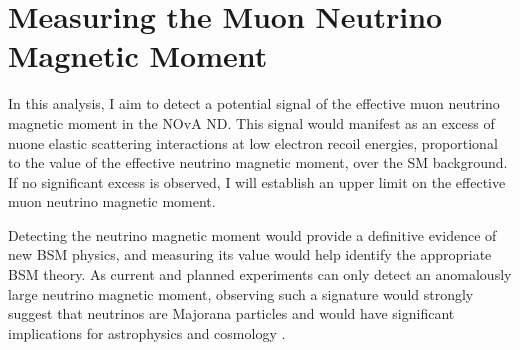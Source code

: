 \chapter{Measuring the Muon Neutrino Magnetic Moment}\label{sec:NeutrinoMagMoment}

In this analysis, I aim to detect a potential signal of the effective muon neutrino magnetic moment in the \gls{NOvA} \gls{ND}. This signal would manifest as an excess of \gls{nuone} elastic scattering interactions at low electron recoil energies, proportional to the value of the effective neutrino magnetic moment, over the \gls{SM} background. If no significant excess is observed, I will establish an upper limit on the effective muon neutrino magnetic moment.



Detecting the neutrino magnetic moment would provide a definitive evidence of new \gls{BSM} physics, and measuring its value would help identify the appropriate \gls{BSM} theory. As current and planned experiments can only detect an anomalously large neutrino magnetic moment, observing such a signature would strongly suggest that neutrinos are Majorana particles and would have significant implications for astrophysics and cosmology \cite{SnowmassNeutrinoFrontierReport.pdf}.



